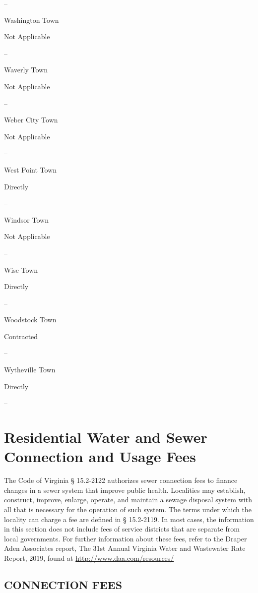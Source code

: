 \documentclass[
]{book}
\begin{document}
--

Washington Town

Not Applicable

--

Waverly Town

Not Applicable

--

Weber City Town

Not Applicable

--

West Point Town

Directly

--

Windsor Town

Not Applicable

--

Wise Town

Directly

--

Woodstock Town

Contracted

--

Wytheville Town

Directly

--

\hypertarget{residential-water-and-sewer-connection-and-usage-fees}{%
\chapter{Residential Water and Sewer Connection and Usage Fees}\label{residential-water-and-sewer-connection-and-usage-fees}}

The Code of Virginia § 15.2-2122 authorizes sewer connection fees to finance changes in a sewer system that improve public health. Localities may establish, construct, improve, enlarge, operate, and maintain a sewage disposal system with all that is necessary for the operation of such system. The terms under which the locality can charge a fee are defined in § 15.2-2119. In most cases, the information in this section does not include fees of service districts that are separate from local governments. For further information about these fees, refer to the Draper Aden Associates report, The 31st Annual Virginia Water and Wastewater Rate Report, 2019, found at \url{http://www.daa.com/resources/}

\hypertarget{connection-fees}{%
\section{CONNECTION FEES}\label{connection-fees}}
\end{document}
